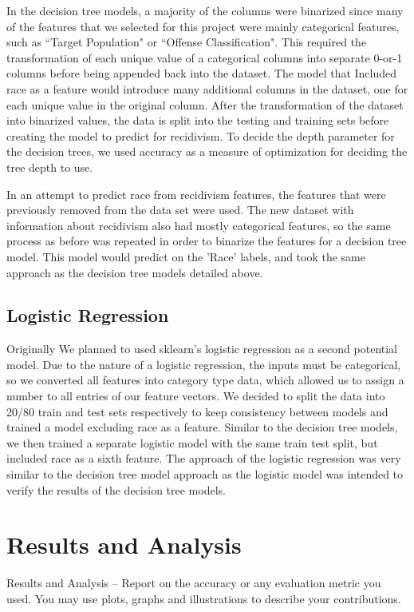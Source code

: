 \documentclass[11pt, sigconf]{acmart}
\begin{document}
In the decision tree models, a majority of the columns were binarized since many of the features that we selected for this project were mainly categorical features, such as ``Target Population" or ``Offense Classification". This required the transformation of each unique value of a categorical columns into separate 0-or-1 columns before being appended back into the dataset. The model that Included race as a feature would introduce many additional columns in the dataset, one for each unique value in the original column. After the transformation of the dataset into binarized values, the data is split into the testing and training sets before creating the model to predict for recidivism. To decide the depth parameter for the decision trees, we used accuracy as a measure of optimization for deciding the tree depth to use. 

In an attempt to predict race from recidivism features, the features that were previously removed from the data set were used. The new dataset with information about recidivism also had mostly categorical features, so the same process as before was repeated in order to binarize the features for a decision tree model. This model would predict on the 'Race' labels, and took the same approach as the decision tree models detailed above. 

\subsection{Logistic Regression}
\hspace{5mm}Originally We planned to used sklearn's logistic regression as a second potential model. Due to the nature of a logistic regression, the inputs must be categorical, so we converted all features into category type data, which allowed us to assign a number to all entries of our feature vectors. We decided to split the data into 20/80 train and test sets respectively to keep consistency between models and trained a model excluding race as a feature. Similar to the decision tree models, we then trained a separate logistic model with the same train test split, but included race as a sixth feature. The approach of the logistic regression was very similar to the decision tree model approach as the logistic model was intended to verify the results of the decision tree models.




\section{Results and Analysis}
Results and Analysis – Report on the accuracy or any evaluation metric you used. You may use
plots, graphs and illustrations to describe your contributions.
\end{document}

